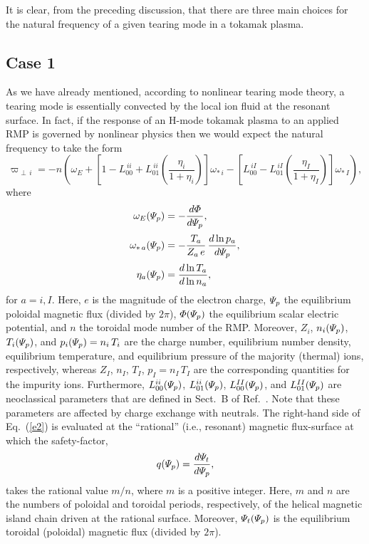 \documentclass[12pt,prb,aps]{revtex4-1}
\begin{document}
It is clear, from the preceding discussion,  that there are three main choices for the natural frequency of a given tearing mode in a tokamak plasma. 

\subsection{Case 1}
As we have already mentioned, according to nonlinear tearing mode theory, a tearing mode is essentially convected by
the local ion fluid at the resonant surface.\cite{nl1,nl2,nl3}
In fact, if the response of an H-mode tokamak plasma to an applied RMP
is governed by nonlinear physics then we would expect the
natural frequency to take the form\,\cite{rf2}
\begin{equation}\label{e2}
\varpi_{\perp\,i} = -n\left(\omega_E +\left[1-L_{00}^{\,ii}+L_{01}^{\,ii}\left(\frac{\eta_i}{1+\eta_i}\right)\right]
\omega_{\ast\,i}
-\left[L_{00}^{\,iI}- L_{01}^{\,iI}\left(\frac{\eta_I}{1+\eta_I}\right)\right]\omega_{\ast\,I}\right),
\end{equation}
where
\begin{align}
\omega_E({\mit\Psi}_p) &= -\frac{d{\mit\Phi}}{d{\mit\Psi}_p},\\[0.5ex]
\omega_{\ast\,a}({\mit\Psi}_p) &=-\frac{T_a}{Z_a\,e}\,\frac{d\ln p_a}{d{\mit\Psi}_p},\\[0.5ex]
\eta_a({\mit\Psi}_p)&=\frac{d\ln T_a}{d\ln n_a},
\end{align}
for $a=i, I$. 
Here,  $e$ is the magnitude of the electron charge, ${\mit\Psi}_p$  the equilibrium poloidal magnetic
flux (divided by $2\pi$), ${\mit\Phi}({\mit\Psi}_p)$ the equilibrium scalar
electric potential, and $n$ the toroidal mode number of the RMP.  Moreover, $Z_i$, $n_i({\mit\Psi}_p)$, $T_i({\mit\Psi}_p)$, and $p_i({\mit\Psi}_p)=n_i\,T_i$   are the charge number, 
equilibrium number density, 
equilibrium temperature, and equilibrium pressure
of the majority (thermal) ions, respectively,
whereas  $Z_I$, $n_I$, $T_I$, $p_I = n_I\,T_I$
are the corresponding quantities for the impurity ions.  
Furthermore, $L_{00}^{ii}({\mit\Psi}_p)$, $L_{01}^{ii}({\mit\Psi}_p)$,  $L_{00}^{II}({\mit\Psi}_p)$, and $L_{01}^{II}({\mit\Psi}_p)$ are neoclassical parameters that are defined
in Sect.~B of Ref.~. Note that these parameters are
affected by charge exchange  with neutrals. 
The right-hand side of Eq.~(\ref{e2}) is evaluated
at the ``rational''  (i.e., resonant) magnetic flux-surface at which the
safety-factor, 
\begin{equation}
q({\mit\Psi}_p)= \frac{d{\mit\Psi}_t}{d{\mit\Psi}_p},
\end{equation}
takes the rational value $m/n$, where $m$ is a positive integer. Here, $m$ and $n$ are the numbers of poloidal and
toroidal periods, respectively, of the helical magnetic island chain driven at the rational surface. Moreover, ${\mit\Psi}_t({\mit\Psi}_p)$ is the equilibrium toroidal (poloidal) magnetic flux (divided by $2\pi$).
\end{document}
